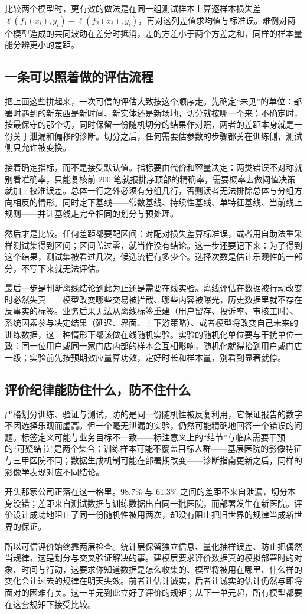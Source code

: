 比较两个模型时，更有效的做法是在同一组测试样本上算逐样本损失差 \(\ell(f_1(x_i),y_i)-\ell(f_2(x_i),y_i)\)，再对这列差值求均值与标准误。难例对两个模型造成的共同波动在差分时抵消，差的方差小于两个方差之和，同样的样本量能分辨更小的差距。

\subsection{一条可以照着做的评估流程}

把上面这些拼起来，一次可信的评估大致按这个顺序走。先确定``未见''的单位：部署时遇到的新东西是新时间、新实体还是新场地，切分就按哪一个来；不确定时，按最保守的那个切，同时保留一份随机切分的结果作对照，两者的差距本身就是一份关于泄漏和偏移的诊断。切分之后，任何需要估参数的步骤都关在训练侧，测试侧只允许被变换。

接着确定指标，而不是接受默认值。指标要由代价和容量决定：两类错误不对称就别看准确率，只能复核前 200 笔就报排序顶部的精确率，需要概率去做阈值决策就加上校准误差。总体一行之外必须有分组几行，否则读者无法排除总体与分组方向相反的情形。同时定下基线——常数基线、持续性基线、单特征基线、当前线上规则——并让基线走完全相同的划分与预处理。

然后才是比较。任何差距都要配区间：对配对损失差算标准误，或者用自助法重采样测试集得到区间；区间盖过零，就当作没有结论。这一步还要记下来：为了得到这个结果，测试集被看过几次，候选流程有多少个。选择次数是估计乐观性的一部分，不写下来就无法评估。

最后一步是判断离线结论到此为止还是需要在线实验。离线评估在数据被行动改变时必然失真——模型改变哪些交易被拦截、哪些内容被曝光，历史数据里就不存在反事实的标签。业务后果无法从离线标签重建（用户留存、投诉率、审核工时）、系统因素参与决定结果（延迟、界面、上下游策略）、或者模型将改变自己未来的训练数据，这三种情形下都该做在线随机实验。实验的随机化单位要与干扰单位一致：同一位用户或同一家门店内部的样本会互相影响，随机化就得抬到用户或门店一级；实验前先按预期效应量算功效，定好时长和样本量，别看到显著就停。

\subsection{评价纪律能防住什么，防不住什么}

严格划分训练、验证与测试，防的是同一份随机性被反复利用，它保证报告的数字不因选择乐观而虚高。但一个毫无泄漏的实验，仍然可能精确地回答一个错误的问题。标签定义可能与业务目标不一致——标注意义上的``结节''与临床需要干预的``可疑结节''是两个集合；训练样本可能不覆盖目标人群——基层医院的影像特征与三甲医院不同；数据生成机制可能在部署期改变——诊断指南更新之后，同样的影像学表现对应不同结论。

开头那家公司正落在这一格里。98.7\% 与 61.3\% 之间的差距不来自泄漏，切分本身没错；差距来自测试数据与训练数据出自同一批医院，而部署发生在新医院。评价设计成功地阻止了同一份随机性被用两次，却没有阻止把旧世界的规律当成新世界的保证。

所以可信评价始终靠两层检查。统计层保留独立信息、量化抽样误差、防止把偶然当规律，这是划分与交叉验证解决的事。建模层要求评价数据真的模拟部署时的对象、时间与行动，这要求你知道数据是怎么收集的、模型将被用在哪里、什么样的变化会让过去的规律在明天失效。前者让估计诚实，后者让诚实的估计仍然与即将面对的困难有关。这一单元到此立好了评价的规矩；从下一单元起，所有模型都要在这套规矩下接受比较。
